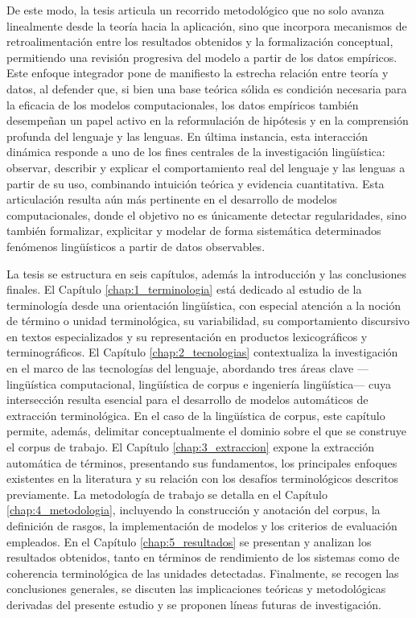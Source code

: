 De este modo, la tesis articula un recorrido metodológico que no solo avanza linealmente desde la teoría hacia la aplicación, sino que incorpora mecanismos de retroalimentación entre los resultados obtenidos y la formalización conceptual, permitiendo una revisión progresiva del modelo a partir de los datos empíricos. Este enfoque integrador pone de manifiesto la estrecha relación entre teoría y datos, al defender que, si bien una base teórica sólida es condición necesaria para la eficacia de los modelos computacionales, los datos empíricos también desempeñan un papel activo en la reformulación de hipótesis y en la comprensión profunda del lenguaje y las lenguas. En última instancia, esta interacción dinámica responde a uno de los fines centrales de la investigación lingüística: observar, describir y explicar el comportamiento real del lenguaje y las lenguas a partir de su uso, combinando intuición teórica y evidencia cuantitativa. Esta articulación resulta aún más pertinente en el desarrollo de modelos computacionales, donde el objetivo no es únicamente detectar regularidades, sino también formalizar, explicitar y modelar de forma sistemática determinados fenómenos lingüísticos a partir de datos observables.

La tesis se estructura en seis capítulos, además la introducción y las conclusiones finales. El Capítulo \ref{chap:1_terminologia} está dedicado al estudio de la terminología desde una orientación lingüística, con especial atención a la noción de término o unidad terminológica, su variabilidad, su comportamiento discursivo en textos especializados y su representación en productos lexicográficos y terminográficos. El Capítulo \ref{chap:2_tecnologias} contextualiza la investigación en el marco de las tecnologías del lenguaje, abordando tres áreas clave —lingüística computacional, lingüística de corpus e ingeniería lingüística— cuya intersección resulta esencial para el desarrollo de modelos automáticos de extracción terminológica. En el caso de la lingüística de corpus, este capítulo permite, además, delimitar conceptualmente el dominio sobre el que se construye el corpus de trabajo. El Capítulo \ref{chap:3_extraccion} expone la extracción automática de términos, presentando sus fundamentos, los principales enfoques existentes en la literatura y su relación con los desafíos terminológicos descritos previamente. La metodología de trabajo se detalla en el Capítulo \ref{chap:4_metodologia}, incluyendo la construcción y anotación del corpus, la definición de rasgos, la implementación de modelos y los criterios de evaluación empleados. En el Capítulo \ref{chap:5_resultados} se presentan y analizan los resultados obtenidos, tanto en términos de rendimiento de los sistemas como de coherencia terminológica de las unidades detectadas. Finalmente, se recogen las conclusiones generales, se discuten las implicaciones teóricas y metodológicas derivadas del presente estudio y se proponen líneas futuras de investigación.